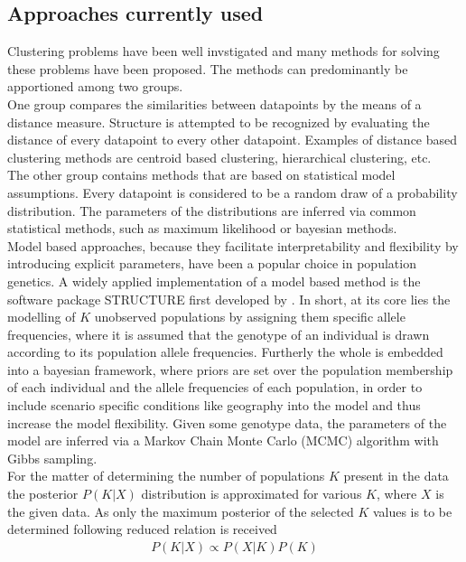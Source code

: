 \documentclass[a4paper, 11pt]{article}
\begin{document}
\subsection{Approaches currently used}
Clustering problems have been well invstigated and many methods for solving these problems have been proposed. The methods can predominantly be apportioned among two groups.\\
One group compares the similarities between datapoints by the means of a distance measure. Structure is attempted to be recognized by evaluating the distance of every datapoint to every other datapoint. Examples of distance based clustering methods are centroid based clustering, hierarchical clustering, etc.\\
The other group contains methods that are based on statistical model assumptions. Every datapoint is considered to be a random draw of a probability distribution. The parameters of the distributions are inferred via common statistical methods, such as maximum likelihood or bayesian methods. \\
Model based approaches, because they facilitate interpretability and flexibility by introducing explicit parameters, have been a popular choice in population genetics. A widely applied \parencite{rosenberg2002genetic, harter2004origin, rosenberg2001empirical} implementation of a model based method is the software package STRUCTURE first developed by \parencite{pritchard2000inference, falush2003inference}. In short, at its core lies the modelling of $K$ unobserved populations by assigning them specific allele frequencies, where it is assumed that the genotype of an individual is drawn according to its population allele frequencies. Furtherly the whole is embedded into a bayesian framework, where priors are set over the population membership of each individual and the allele frequencies of each population, in order to include scenario specific conditions like geography into the model and thus increase the model flexibility. Given some genotype data, the parameters of the model are inferred via a Markov Chain Monte Carlo (MCMC) algorithm with Gibbs sampling.\\
For the matter of determining the number of populations $K$ present in the data the posterior $P(K|X)$ distribution is approximated for various $K$, where $X$ is the given data. As only the maximum posterior of the selected $K$ values is to be determined following reduced relation is received
\begin{align*}
P(K|X) \propto P(X|K)P(K) 
\end{align*}
\end{document}
